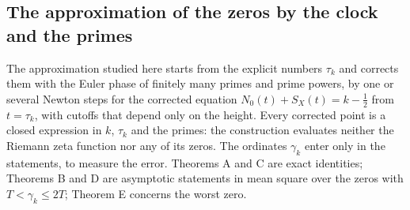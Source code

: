 \documentclass[preprint,12pt]{elsarticle}
\numberwithin{equation}{section}
\theoremstyle{plain}
\theoremstyle{definition}
\theoremstyle{remark}
\newcommand{\NO}{N_0}
\begin{document}
\subsection{The approximation of the zeros by the clock and the primes}
\label{subsec:program}
The approximation studied here starts from the explicit numbers $\tau_k$ and corrects them with the Euler phase of finitely many primes and prime powers, by one or several Newton steps for the corrected equation $\NO(t)+S_X(t)=k-\frac12$ from $t=\tau_k$, with cutoffs that depend only on the height. Every corrected point is a closed expression in $k$, $\tau_k$ and the primes: the construction evaluates neither the Riemann zeta function nor any of its zeros. The ordinates $\gamma_k$ enter only in the statements, to measure the error. Theorems A and C are exact identities; Theorems B and D are asymptotic statements in mean square over the zeros with $T<\gamma_k\le2T$; Theorem E concerns the worst zero.
\end{document}
